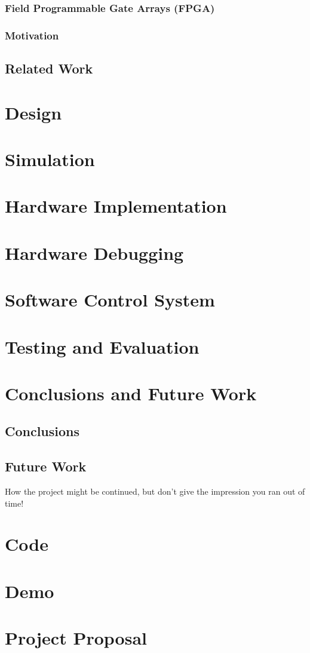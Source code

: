 \documentclass[a4paper]{report}
\begin{document}
\subsection{Field Programmable Gate Arrays (FPGA)}

\subsection{Motivation}

\section{Related Work}

\chapter{Design}

\chapter{Simulation}

\chapter{Hardware Implementation}

\chapter{Hardware Debugging}

\chapter{Software Control System}

\chapter{Testing and Evaluation}

\chapter{Conclusions and Future Work}

\section{Conclusions}

\section{Future Work}
How the project might be continued, but don't give the impression you ran out of time!

\printbibliography[title=References]

\appendix

\chapter{Code}

\chapter{Demo}

\chapter{Project Proposal}
\end{document}
